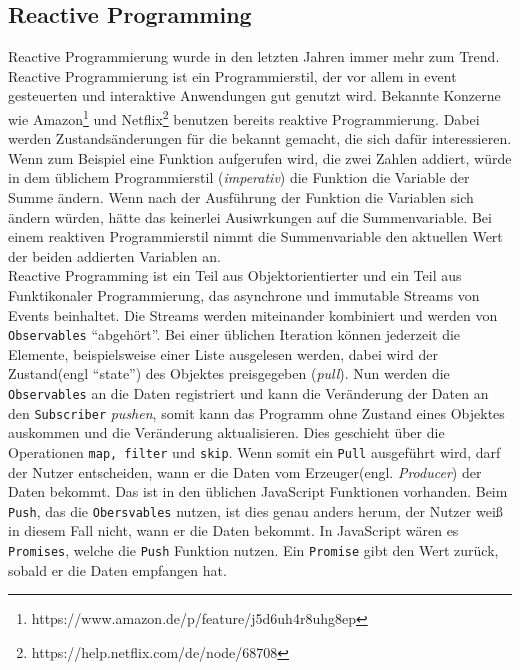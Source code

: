 \subsection{Reactive Programming}
Reactive Programmierung wurde in den letzten Jahren immer mehr zum Trend\cite{Bainomugisha2013}. Reactive Programmierung ist ein Programmierstil, der vor allem in event gesteuerten und interaktive Anwendungen gut genutzt wird. Bekannte Konzerne wie Amazon\footnote{https://www.amazon.de/p/feature/j5d6uh4r8uhg8ep} und Netflix\footnote{https://help.netflix.com/de/node/68708} benutzen bereits reaktive Programmierung. Dabei werden Zustands\"anderungen f\"ur die bekannt gemacht, die sich daf\"ur interessieren. Wenn zum Beispiel eine Funktion aufgerufen wird, die zwei Zahlen addiert, w\"urde in dem \"ublichem Programmierstil (\textit{imperativ}) die Funktion die Variable der Summe \"andern. Wenn nach der Ausf\"uhrung der Funktion die Variablen sich \"andern w\"urden, h\"atte das keinerlei Ausiwrkungen auf die Summenvariable. Bei einem reaktiven Programmierstil nimmt die Summenvariable den aktuellen Wert der beiden addierten Variablen an\cite{Lambert2016}. \\
Reactive Programming ist ein Teil aus Objektorientierter und ein Teil aus Funktikonaler Programmierung, das asynchrone und immutable Streams von Events beinhaltet. Die Streams werden miteinander kombiniert und werden von \texttt{Observables} \enquote{abgeh\"ort}. Bei einer \"ublichen Iteration k\"onnen jederzeit die Elemente, beispielsweise einer Liste ausgelesen werden, dabei wird der Zustand(engl \enquote{state}) des Objektes preisgegeben (\textit{pull}). Nun werden die \texttt{Observables} an die Daten registriert und kann die Ver\"anderung der Daten an den \texttt{Subscriber} \textit{pushen}, somit kann das Programm ohne Zustand eines Objektes auskommen und die Ver\"anderung aktualisieren\cite{Lohmuller2016}. Dies geschieht \"uber die Operationen \texttt{map, filter} und \texttt{skip}\cite{Lee2016}.
Wenn somit ein \texttt{Pull} ausgef\"uhrt wird, darf der Nutzer entscheiden, wann er die Daten vom Erzeuger(engl. \textit{Producer}) der Daten bekommt. Das ist in den \"ublichen JavaScript Funktionen vorhanden. Beim \texttt{Push}, das die  \texttt{Obersvables} nutzen, ist dies genau anders herum, der Nutzer wei\ss{} in diesem Fall nicht, wann er die Daten bekommt. In JavaScript w\"aren es \texttt{Promises}, welche die  \texttt{Push} Funktion nutzen. Ein  \texttt{Promise} gibt den Wert zur\"uck, sobald er die Daten empfangen hat\cite{Gruijs2017}.\\
